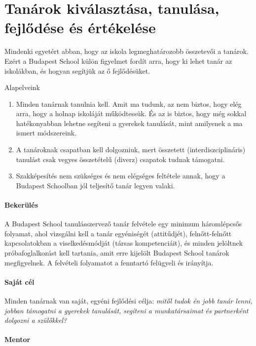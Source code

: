 \section{Tanárok kiválasztása, tanulása, fejlődése és értékelése}

Mindenki egyetért abban, hogy az iskola legmeghatározobb összetevői a tanárok.
Ezért a Budapest School külön figyelmet fordít arra, hogy ki lehet tanár az
iskolákban, és hogyan segítjük az ő fejlődésüket.

Alapelveink
\begin{enumerate}
  \item Minden tanárnak tanulnia kell. Amit ma tudunk, az nem biztos, hogy elég
        arra, hogy a holnap iskoláját működtessük. És az is biztos, hogy még sokkal
        hatékonyabban lehetne segíteni a gyerekek tanulását, mint amilyenek a ma ismert
        módszereink.

  \item A tanároknak csapatban kell dolgozniuk, mert összetett
        (interdiszciplináris) tanulást csak vegyes összetételű (diverz) csapatok tudnak
        támogatni.

  \item Szakképesítés nem szükséges és nem elégséges feltétele annak, hogy a
        Budapest Schoolban jól teljesítő tanár legyen valaki.
\end{enumerate}

\paragraph{Bekerülés}
A Budapest School tanulásszervező tanár felvétele egy minimum háromlépcsős
folyamat, ahol vizsgálni kell a tanár egyéniségét (attitűdjét), felnőtt-felnőtt
kapcsolatokban a viselkedésmódját (társas kompetenciáit), és minden jelöltnek
próbafoglalkozást kell tartania, amit erre kijelölt Budapest School tanárok
megfigyelnek. A felvételi folyamatot a fenntartó felügyeli és irányítja.

\paragraph{Saját cél}

Minden tanárnak van saját, egyéni fejlődési célja: \emph{mitől tudok én jobb
  tanár lenni, jobban támogatni a gyerekek tanulását, segíteni a munkatársaimat
  és partnerként dolgozni a szülőkkel?}

\paragraph{Mentor}

